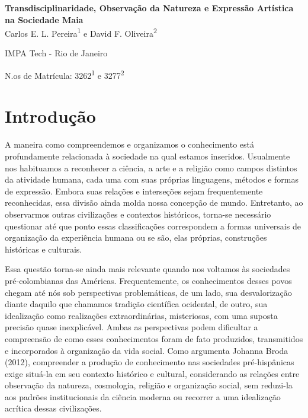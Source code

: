 \documentclass[11pt, a4paper]{article}
\begin{document}
\noindent


\begin{center}
\textbf{ \large {Transdisciplinaridade, Observação da Natureza e
Expressão Artística na Sociedade Maia}}\\
Carlos E. L. Pereira\textsuperscript{1} e David F. Oliveira\textsuperscript{2}

IMPA Tech - Rio de Janeiro

{\small N.os de Matrícula:  3262\textsuperscript{1} e 3277\textsuperscript{2}}
\end{center} 

\section{Introdução} 


A maneira como compreendemos e organizamos o conhecimento está profundamente relacionada à sociedade na qual estamos inseridos. Usualmente nos habituamos a reconhecer a ciência, a arte e a religião como campos distintos da atividade humana, cada uma com suas próprias linguagens, métodos e formas de expressão. Embora suas relações e interseções sejam frequentemente reconhecidas, essa divisão ainda molda nossa concepção de mundo. Entretanto, ao observarmos outras civilizações e contextos históricos, torna-se necessário questionar até que ponto essas classificações correspondem a formas universais de organização da experiência humana ou se são, elas próprias, construções históricas e culturais.

Essa questão torna-se ainda mais relevante quando nos voltamos às sociedades pré-colombianas das Américas. Frequentemente, os conhecimentos desses povos chegam até nós sob perspectivas problemáticas, de um lado, sua desvalorização diante daquilo que chamamos tradição científica ocidental, de outro, sua idealização como realizações extraordinárias, misteriosas, com uma suposta precisão quase inexplicável. Ambas as perspectivas podem dificultar a compreensão de como esses conhecimentos foram de fato produzidos, transmitidos e incorporados à organização da vida social. Como argumenta Johanna Broda (2012), compreender a produção de conhecimento nas sociedades pré-hispânicas exige situá-la em seu contexto histórico e cultural, considerando as relações entre observação da natureza, cosmologia, religião e organização social, sem reduzi-la aos padrões institucionais da ciência moderna ou recorrer a uma idealização acrítica dessas civilizações.
\end{document}
